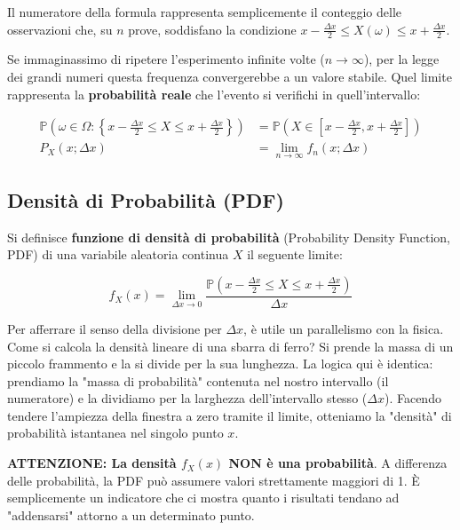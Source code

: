 Il numeratore della formula rappresenta semplicemente il conteggio delle osservazioni che, su $n$ prove, soddisfano la condizione $x - \frac{\Delta x}{2} \le X(\omega) \le x + \frac{\Delta x}{2}$.

Se immaginassimo di ripetere l'esperimento infinite volte ($n \to \infty$), per la legge dei grandi numeri questa frequenza convergerebbe a un valore stabile. Quel limite rappresenta la \textbf{probabilità reale} che l'evento si verifichi in quell'intervallo:

\begin{align}
\mathbb{P}\left(\omega \in \Omega : \left\{x - \frac{\Delta x}{2} \le X \le x + \frac{\Delta x}{2}\right\}\right) &= \mathbb{P}\left(X \in \left[x - \frac{\Delta x}{2}, x + \frac{\Delta x}{2}\right]\right) \nonumber \\
P_X(x; \Delta x) &= \lim_{n \to \infty} f_n(x; \Delta x)
\end{align}

\subsection{Densità di Probabilità (PDF)}

Si definisce \textbf{funzione di densità di probabilità} (Probability Density Function, PDF) di una variabile aleatoria continua $X$ il seguente limite:

\begin{equation}
\boxed{f_X(x) = \lim_{\Delta x \to 0} \frac{\mathbb{P}\left(x - \frac{\Delta x}{2} \le X \le x + \frac{\Delta x}{2}\right)}{\Delta x}}
\end{equation}

Per afferrare il senso della divisione per $\Delta x$, è utile un parallelismo con la fisica. Come si calcola la densità lineare di una sbarra di ferro? Si prende la massa di un piccolo frammento e la si divide per la sua lunghezza. 
La logica qui è identica: prendiamo la "massa di probabilità" contenuta nel nostro intervallo (il numeratore) e la dividiamo per la larghezza dell'intervallo stesso ($\Delta x$).
Facendo tendere l'ampiezza della finestra a zero tramite il limite, otteniamo la "densità" di probabilità istantanea nel singolo punto $x$.

\textbf{ATTENZIONE: La densità $f_X(x)$ NON è una probabilità}. A differenza delle probabilità, la PDF può assumere valori strettamente maggiori di 1. È semplicemente un indicatore che ci mostra quanto i risultati tendano ad "addensarsi" attorno a un determinato punto.

